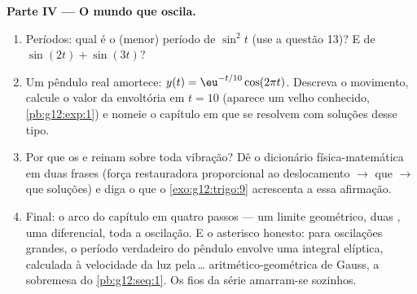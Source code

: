 \begin{problem}
\medskip
\noindent\textbf{Parte IV --- O mundo que oscila.}
\begin{enumerate}[resume]
  \item Períodos: qual é o (menor) período de $\sin^2 t$ (use a
        questão 13)? E de $\sin(2t) + \sin(3t)$?
  \item Um pêndulo real amortece:
        $y(t) = \eu^{-t/10}\cos(2\pi t)$. Descreva o movimento,
        calcule o valor da envoltória em $t = 10$ (aparece um
        velho conhecido, \cref{pb:g12:exp:1}) e nomeie o capítulo
        em que se resolvem  com soluções desse tipo.
  \item Por que os  e  reinam sobre toda vibração?
        Dê o dicionário física-matemática em duas frases (força
        restauradora proporcional ao deslocamento $\rightarrow$
        que  $\rightarrow$ que soluções) e diga o que o
        \cref{exo:g12:trigo:9} acrescenta a essa afirmação.
  \item Final: o arco do capítulo em quatro passos --- um limite
        geométrico, duas , uma  diferencial, toda
        a oscilação. E o asterisco honesto: para oscilações
        grandes, o período verdadeiro do pêndulo envolve uma
        integral elíptica, calculada à velocidade da luz
        pela\,\dots {} aritmético-geométrica de Gauss, a
        sobremesa do \cref{pb:g12:seq:1}. Os fios da série
        amarram-se sozinhos.
\end{enumerate}
\end{problem}
